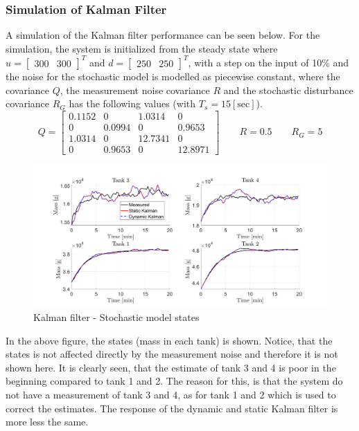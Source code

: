 \subsubsection{Simulation of Kalman Filter}
A simulation of the Kalman filter performance can be seen below. For the simulation, the system is initialized from the steady state where $u=\begin{bmatrix} 300 & 300 \end{bmatrix}^T$ and $d=\begin{bmatrix} 250 & 250 \end{bmatrix}^T$, with a step on the input of 10\% and the noise for the stochastic model is modelled as piecewise constant, where the covariance $Q$, the measurement noise covariance $R$ and the stochastic disturbance covariance $R_G$ has the following values (with $T_s=15[\text{sec}]$).
\begin{equation}
    Q=\begin{bmatrix}
        0.1152 & 0 & 1.0314 & 0\\
        0 & 0.0994 & 0 & 0.9653\\
        1.0314  & 0 & 12.7341 & 0\\
        0 & 0.9653 & 0 & 12.8971
    \end{bmatrix} \qquad R=0.5 \qquad R_G=5
\end{equation}
\begin{figure}[H] 
    \centering
    \includegraphics[width=1\textwidth]{Figures/Pr5.2_stoc_states.png}
    \caption{Kalman filter - Stochastic model states}
    \label{fig:Kalman_stoc_state}
\end{figure}
In the above figure, the states (mass in each tank) is shown. Notice, that the states is not affected directly by the measurement noise and therefore it is not shown here. It is clearly seen, that the estimate of tank 3 and 4 is poor in the beginning compared to tank 1 and 2. The reason for this, is that the system do not have a measurement of tank 3 and 4, as for tank 1 and 2 which is used to correct the estimates. The response of the dynamic and static Kalman filter is more less the same.\\
